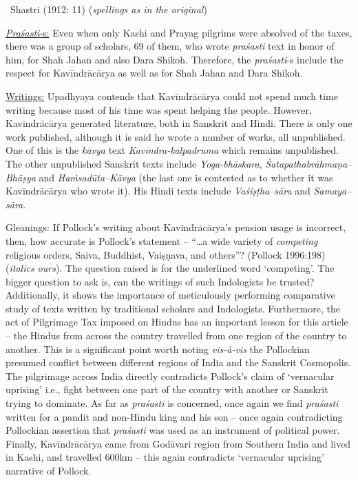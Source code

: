 \begin{enumerate}
\begin{myquote}
~\hfill Shastri (1912: 11) (\textit{spellings as in the original})
\end{myquote}

 \underline{\textit{Praśasti}-s:} Even when only Kashi and Prayag pilgrims were absolved of the taxes, there was a group of scholars, 69 of them, who wrote \textit{praśasti} text in honor of him, for Shah Jahan and also Dara Shikoh. Therefore, the \textit{praśasti}-s include the respect for Kavīndrācārya as well as for Shah Jahan and Dara Shikoh.

 \underline{Writings:} Upadhyaya contends that Kavīndrācārya could not spend much time writing because most of his time was spent helping the people. However, Kavīndrācārya generated literature, both in Sanskrit and Hindi. There is only one work published, although it is said he wrote a number of works, all unpublished. One of this is the \textit{kāvya} text \textit{Kavīndra-kalpadruma} which remains unpublished. The other unpublished Sanskrit texts include \textit{Yoga-bhāskara}, \textit{Śatapathabrāhmaṇa--Bhāṣya} and \textit{Haṁsadūta--Kāvya} (the last one is contested as to whether it was Kavīndrācārya who wrote it). His Hindi texts include \textit{Vaśiṣṭha--sāra} and \textit{Samaya--sāra}.

 Gleanings: If Pollock’s writing about Kavīndrācārya’s pension usage is incorrect, then, how accurate is Pollock’s statement – “…a wide variety of \textit{competing} religious orders, Saiva, Buddhist, Vaiṣṇava, and others”? (Pollock 1996:198)(\textit{italics ours}). The question raised is for the underlined word ‘competing’. The bigger question to ask is, can the writings of such Indologists be trusted? Additionally, it shows the importance of meticulously performing comparative study of texts written by traditional scholars and Indologists. Furthermore, the act of Pilgrimage Tax imposed on Hindus has an important lesson for this article – the Hindus from across the country travelled from one region of the country to another. This is a significant point worth noting \textit{vis-à-vis} the Pollockian presumed conflict between different regions of India and the Sanskrit Cosmopolis. The pilgrimage across India directly contradicts Pollock’s claim of ‘vernacular uprising’ i.e., fight between one part of the country with another or Sanskrit trying to dominate. As far as \textit{praśasti} is concerned, once again we find \textit{praśasti} written for a pandit and non-Hindu king and his son – once again contradicting Pollockian assertion that \textit{praśasti} was used as an instrument of political power. Finally, Kavīndrācārya came from Godāvari region from Southern India and lived in Kashi, and travelled 600km – this again contradicts ‘vernacular uprising’ narrative of Pollock.


\end{enumerate}
